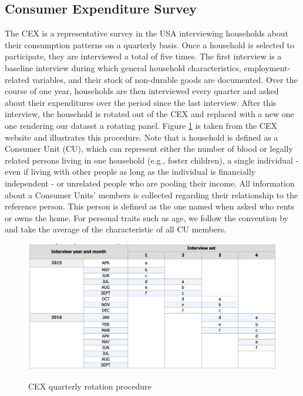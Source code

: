 \subsection{Consumer Expenditure Survey} 
The CEX is a representative survey in the USA interviewing households about their consumption patterns on a quarterly basis. Once a household is selected to participate, they are interviewed a total of five times. The first interview is a baseline interview during which general household characteristics, employment-related variables, and their stock of non-durable goods are documented. Over the course of one year, households are then interviewed every quarter and asked about their expenditures over the period since the last interview. After this interview, the household is rotated out of the CEX and replaced with a new one one rendering our dataset a rotating panel. Figure \ref{fig:cex_rotation} is taken from the CEX website and illustrates this procedure. Note that a household is defined as a Consumer Unit (CU), which can represent either the number of blood or legally related persons living in one household (e.g., foster children), a single individual - even if living with other people as long as the individual is financially independent - or unrelated people who are pooling their income. All information about a Consumer Units' members is collected regarding their relationship to the reference person. This person is defined as the one named when asked who rents or owns the home. For personal traits such as age, we follow the convention by \cite{parker_etal_13} and take the average of the characteristic of all CU members.
\begin{figure}[t]
    \caption{CEX quarterly rotation procedure}
    \centering
    \includegraphics[width=.9\linewidth]{figures/CEX_rotation_table.png}
    \label{fig:cex_rotation}
\end{figure}
